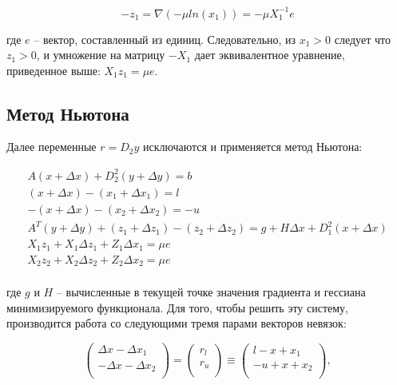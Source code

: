\documentclass[a4paper, 12pt, titlepage]{article}
\theoremstyle{definition}
\theoremstyle{plain}
\theoremstyle{plain}
\begin{document}
\begin{equation}
 -z_{1} = \nabla(-\mu ln(x_{1})) = -\mu X_{1}^{-1} e
\end{equation}

где $e$ -- вектор, составленный из единиц. Следовательно, из $x_{1} > 0$
следует что $z_{1} > 0$, и умножение на матрицу $-X_{1}$ дает эквивалентное
уравнение, приведенное выше: $X_{1} z_{1} = \mu e$.

\subsection{Метод Ньютона}

Далее переменные $r = D_{2} y$ исключаются и применяется метод Ньютона:

\begin{equation}
 \begin{aligned}
  A(x + \Delta x) + D_{2}^{2} (y + \Delta y) = b \\
  (x + \Delta x) - (x_{1} + \Delta x_{1}) = l \\
  -(x + \Delta x) - (x_{2} + \Delta x_{2}) = -u \\
  A^{T} (y + \Delta y) + (z_{1} + \Delta z_{1}) - (z_{2} + \Delta z_{2}) =
  g + H \Delta x + D_{1}^{2} (x + \Delta x) \\
  X_{1} z_{1} + X_{1} \Delta z_{1} + Z_{1} \Delta x_{1} = \mu e \\
  X_{2} z_{2} + X_{2} \Delta z_{2} + Z_{2} \Delta x_{2} = \mu e \\
 \end{aligned}
\end{equation}

где $g$ и $H$ -- вычисленные в текущей точке значения градиента и гессиана
минимизируемого функционала. Для того, чтобы решить эту систему, производится 
работа со следующими тремя парами векторов невязок:

\begin{equation}
 \label{eq:newton1}
 \left(
  \begin{array}{c}
   \Delta x - \Delta x_{1} \\
   - \Delta x - \Delta x_{2} \\
   \end{array}
 \right) =
 \left(
  \begin{array}{c}
   r_{l} \\
   r_{u} \\
   \end{array}
 \right) \equiv
 \left(
  \begin{array}{c}
   l - x + x_{1} \\
   -u + x + x_{2} \\
   \end{array}
 \right),
\end{equation}
\end{document}
